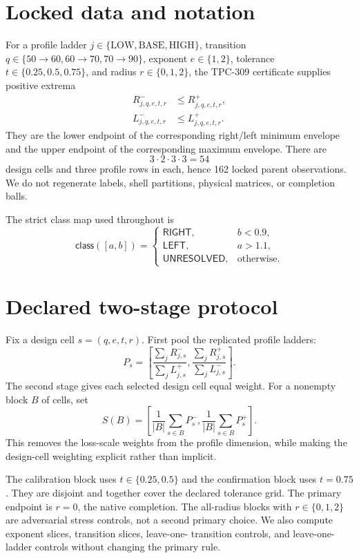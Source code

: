 \documentclass[10pt,a4paper]{article}
\begin{document}
\section{Locked data and notation}

For a profile ladder $j\in\{\mathrm{LOW},\mathrm{BASE},\mathrm{HIGH}\}$,
transition $q\in\{50\!\to\!60,60\!\to\!70,70\!\to\!90\}$, exponent
$e\in\{1,2\}$, tolerance $t\in\{0.25,0.5,0.75\}$, and radius
$r\in\{0,1,2\}$, the TPC-309 certificate supplies positive extrema
\begin{align*}
 R_{j,q,e,t,r}^{-}&\le R_{j,q,e,t,r}^{+},\\
 L_{j,q,e,t,r}^{-}&\le L_{j,q,e,t,r}^{+}.
\end{align*}
They are the lower endpoint of the corresponding right/left minimum envelope
and the upper endpoint of the corresponding maximum envelope.  There are
\[
  3\cdot2\cdot3\cdot3=54
\]
design cells and three profile rows in each, hence 162 locked parent
observations.  We do not regenerate labels, shell partitions, physical
matrices, or completion balls.

The strict class map used throughout is
\[
 \mathsf{class}([a,b])=
 \begin{cases}
 \mathsf{RIGHT},&b<0.9,\\
 \mathsf{LEFT},&a>1.1,\\
 \mathsf{UNRESOLVED},&\text{otherwise.}
 \end{cases}
\]

\section{Declared two-stage protocol}

Fix a design cell $s=(q,e,t,r)$.  First pool the replicated profile ladders:
\begin{equation}
 P_s=\left[
 \frac{\sum_j R_{j,s}^{-}}{\sum_j L_{j,s}^{+}},
 \frac{\sum_j R_{j,s}^{+}}{\sum_j L_{j,s}^{-}}
 \right].
 \label{eq:within}
\end{equation}
The second stage gives each selected design cell equal weight.  For a nonempty
block $B$ of cells, set
\begin{equation}
 S(B)=\left[
 \frac{1}{|B|}\sum_{s\in B}P_s^{-},
 \frac{1}{|B|}\sum_{s\in B}P_s^{+}
 \right].
 \label{eq:between}
\end{equation}
This removes the loss-scale weights from the profile dimension, while making
the design-cell weighting explicit rather than implicit.

The calibration block uses $t\in\{0.25,0.5\}$ and the confirmation block uses
$t=0.75$.  They are disjoint and together cover the declared tolerance grid.
The primary endpoint is $r=0$, the native completion.  The all-radius blocks
with $r\in\{0,1,2\}$ are adversarial stress controls, not a second primary
choice.  We also compute exponent slices, transition slices, leave-one-
transition controls, and leave-one-ladder controls without changing the
primary rule.
\end{document}
